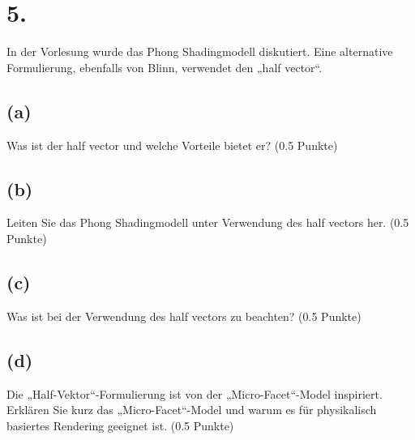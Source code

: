 \documentclass[12pt]{scrreprt}
\begin{document}
\section*{5.}
In der Vorlesung wurde das Phong Shadingmodell diskutiert. Eine alternative Formulierung, ebenfalls von Blinn, verwendet den „half vector“.

\subsection*{(a)}
Was ist der half vector und welche Vorteile bietet er? (0.5 Punkte)
\subsection*{(b)}
Leiten Sie das Phong Shadingmodell unter Verwendung des half vectors her. (0.5 Punkte)
\subsection*{(c)}
Was ist bei der Verwendung des half vectors zu beachten? (0.5 Punkte)
\subsection*{(d)}
Die „Half-Vektor“-Formulierung ist von der „Micro-Facet“-Model inspiriert. Erklären Sie kurz
das „Micro-Facet“-Model und warum es für physikalisch basiertes Rendering geeignet ist. (0.5
Punkte)
\end{document}
